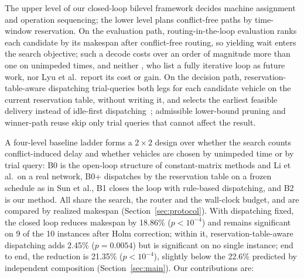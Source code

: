 \documentclass[preprint,review,12pt,authoryear,doubleblind]{elsarticle}
\newcommand{\NCases}{10}
\newcommand{\GainLoopRule}{18.86\%}      %
\newcommand{\PLoopRule}{<10^{-4}}
\newcommand{\GainProbeLoop}{2.45\%}      %
\newcommand{\PProbeLoop}{=0.0054}
\newcommand{\GainEndToEnd}{21.35\%}      %
\newcommand{\PEndToEnd}{<10^{-4}}
\newcommand{\GainIndepProduct}{22.6\%}
\newcommand{\CellsSigLoopAdj}{9}
\begin{document}
The upper level of our closed-loop bilevel framework decides machine assignment and operation sequencing; the lower level plans conflict-free paths by time-window reservation.
On the evaluation path, routing-in-the-loop evaluation ranks each candidate by its makespan after conflict-free routing, so yielding wait enters the search objective; such a decode costs over an order of magnitude more than one on unimpeded times, and neither \citet{li2026framework}, who list a fully iterative loop as future work, nor Lyu et al.\ report its cost or gain.
On the decision path, reservation-table-aware dispatching trial-queries both legs for each candidate vehicle on the current reservation table, without writing it, and selects the earliest feasible delivery instead of idle-first dispatching~\citep{lu2022agv}; admissible lower-bound pruning and winner-path reuse skip only trial queries that cannot affect the result.

A four-level baseline ladder forms a $2\times2$ design over whether the search counts conflict-induced delay and whether vehicles are chosen by unimpeded time or by trial query: B0 is the open-loop structure of constant-matrix methods and Li et al.\ on a real network, B0+ dispatches by the reservation table on a frozen schedule as in Sun et al., B1 closes the loop with rule-based dispatching, and B2 is our method.
All share the search, the router and the wall-clock budget, and are compared by realized makespan (Section~\ref{sec:protocol}).
With dispatching fixed, the closed loop reduces makespan by \GainLoopRule{} ($p\PLoopRule$) and remains significant on \CellsSigLoopAdj{} of the \NCases{} instances after Holm correction; within it, reservation-table-aware dispatching adds \GainProbeLoop{} ($p\PProbeLoop$) but is significant on no single instance; end to end, the reduction is \GainEndToEnd{} ($p\PEndToEnd$), slightly below the \GainIndepProduct{} predicted by independent composition (Section~\ref{sec:main}).
Our contributions are:
\end{document}

